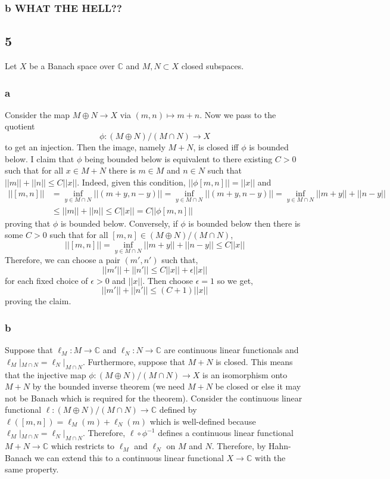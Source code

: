 \documentclass[12pt]{article}
\renewcommand{\C}{\mathbb{C}}
\begin{document}
\subsubsection{b WHAT THE HELL??}

\subsection{5}

Let $X$ be a Banach space over $\C$ and $M,N \subset X$ closed subspaces.

\subsubsection{a}


Consider the map $M \oplus N \to X$ via $(m,n) \mapsto m + n$. Now we pass to the quotient \[ \phi : (M \oplus N)/(M \cap N) \to X \]
to get an injection. Then the image, namely $M + N$, is closed iff $\phi$ is bounded below. I claim that $\phi$ being bounded below is equivalent to there existing $C > 0$ such that for all $x \in M + N$ there is $m \in M$ and $n \in N$ such that $|| m || + || n || \le C || x ||$. Indeed, given this condition, $|| \phi [m,n] || = || x ||$ and 
\begin{align*}
|| [m, n] || & = \inf_{y \in M \cap N} || (m+y,n-y) || = \inf_{y \in M \cap N} || (m + y, n - y) || = \inf_{y \in M \cap N} || m  + y || + || n - y|| 
\\
& \le || m || + || n || \le C || x || = C || \phi [m, n] || 
\end{align*} 
proving that $\phi$ is bounded below. Conversely, if $\phi$ is bounded below then there is some $C > 0$ such that for all $[m,n] \in (M \oplus N)/(M \cap N)$,
\[ || [m,n] || = \inf_{y \in M \cap N} || m + y|| + || n - y || \le C || x || \]
Therefore, we can choose a pair $(m', n')$ such that,
\[ || m' || + || n' || \le C || x || + \epsilon || x || \]
for each fixed choice of $\epsilon > 0$ and $|| x ||$. Then choose $\epsilon = 1$ so we get,
\[ || m' || + || n' || \le (C + 1) || x || \]
proving the claim.

\subsubsection{b}

Suppose that $\ell_M : M \to \C$ and $\ell_N : N \to \C$ are continuous linear functionals and $\ell_M |_{M \cap N} = \ell_N |_{M \cap N}$. Furthermore, suppose that $M + N$ is closed. This means that the injective map $\phi : (M \oplus N)/(M \cap N) \to X$ is an isomorphism onto $M + N$ by the bounded inverse theorem (we need $M + N$ be closed or else it may not be Banach which is required for the theorem). Consider the continuous linear functional $\ell : (M \oplus N)/(M \cap N) \to \C$ defined by $\ell([m,n]) = \ell_M(m) + \ell_N(m)$ which is well-defined because $\ell_M |_{M \cap N} = \ell_N |_{M \cap N}$. Therefore, $\ell \circ \phi^{-1}$ defines a continuous linear functional $M + N \to \C$ which restricts to $\ell_M$ and $\ell_N$ on $M$ and $N$. Therefore, by Hahn-Banach we can extend this to a continuous linear functional $X \to \C$ with the same property.
\end{document}
